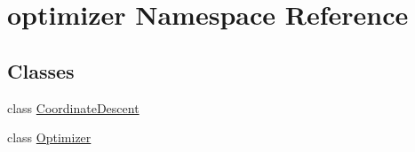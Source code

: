 \hypertarget{namespaceoptimizer}{}\section{optimizer Namespace Reference}
\label{namespaceoptimizer}
\subsection*{Classes}
\begin{DoxyCompactItemize}
\item 
class \hyperlink{classoptimizer_1_1_coordinate_descent}{Coordinate\+Descent}
\item 
class \hyperlink{classoptimizer_1_1_optimizer}{Optimizer}
\end{DoxyCompactItemize}
